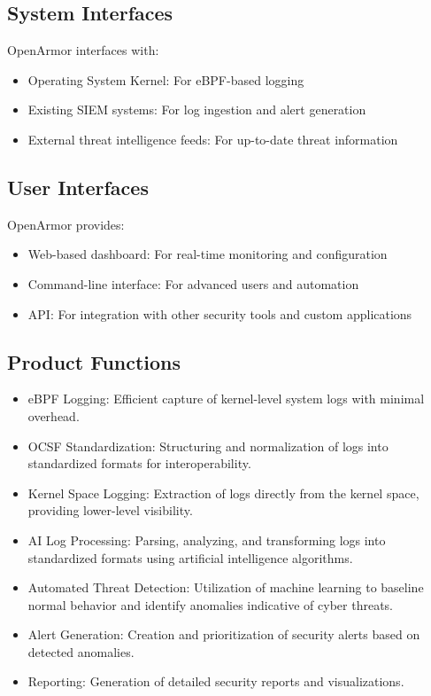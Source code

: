 \subsection{System Interfaces}
OpenArmor interfaces with:
\begin{itemize}
    \item Operating System Kernel: For eBPF-based logging
    \item Existing SIEM systems: For log ingestion and alert generation
    \item External threat intelligence feeds: For up-to-date threat information
\end{itemize}

\subsection{User Interfaces}
OpenArmor provides:
\begin{itemize}
    \item Web-based dashboard: For real-time monitoring and configuration
    \item Command-line interface: For advanced users and automation
    \item API: For integration with other security tools and custom applications
\end{itemize}

\subsection{Product Functions}
\begin{itemize}
    \item eBPF Logging: Efficient capture of kernel-level system logs with minimal overhead.
    \item OCSF Standardization: Structuring and normalization of logs into standardized formats for interoperability.
    \item Kernel Space Logging: Extraction of logs directly from the kernel space, providing lower-level visibility.
    \item AI Log Processing: Parsing, analyzing, and transforming logs into standardized formats using artificial intelligence algorithms.
    \item Automated Threat Detection: Utilization of machine learning to baseline normal behavior and identify anomalies indicative of cyber threats.
    \item Alert Generation: Creation and prioritization of security alerts based on detected anomalies.
    \item Reporting: Generation of detailed security reports and visualizations.
\end{itemize}

